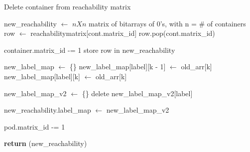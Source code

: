 \begin{algorithm}
    \caption{Delete container from reachability matrix}
    \label{algo:deletecontainer}
    \begin{algorithmic}[1]
            \State new\_reachability $\gets$ $nXn$ matrix of bitarrays of 0's, with  n = \# of containers
            \State {}
                \State row $\gets$ reachabilitymatrix[cont.matrix\_id]
                \State row.pop(cont.matrix\_id) 
                
                    \State container.matrix\_id -= 1
                \EndIf
                \State store row in new\_reachability
            \EndFor
            
            \State {}
            \State new\_label\_map $\gets$ \{\}
                       \State new\_label\_map[label][k - 1] $\gets$ old\_arr[k] 
                        \State new\_label\_map[label][k] $\gets$ old\_arr[k] 
                    \EndIf
                \EndFor
            \EndFor

            \State {}
            \State new\_label\_map\_v2 $\gets$ \{\}
                    \State delete new\_label\_map\_v2[label]
                \EndIf
            \EndFor
        
            \State new\_reachability.label\_map $\gets$ new\_label\_map\_v2
        
                    \State pod.matrix\_id -= 1
                \EndIf
            \EndFor
        
            \State \textbf{return} (new\_reachability)
        \EndFunction
  \end{algorithmic}
\end{algorithm}
